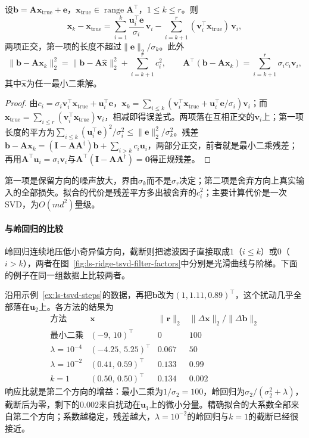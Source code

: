 \begin{theorem}[截断SVD的误差分解]
\label{thm:ls-tsvd-error-decomposition}
设$\bm b=\bm A\bm x_{\mathrm{true}}+\bm e$，$\bm x_{\mathrm{true}}\in\operatorname{range}\bm A^\top$，$1\leq k\leq r$。则
\[
 \bm x_k-\bm x_{\mathrm{true}}=\sum_{i=1}^k\frac{\bm u_i^\top\bm e}{\sigma_i}\,\bm v_i-\sum_{i=k+1}^r(\bm v_i^\top\bm x_{\mathrm{true}})\,\bm v_i ,
\]
两项正交，第一项的长度不超过$\lVert\bm e\rVert_2/\sigma_k$。此外
\[
 \lVert\bm b-\bm A\bm x_k\rVert_2^2=\lVert\bm b-\bm A\hat{\bm x}\rVert_2^2+\sum_{i=k+1}^rc_i^2,\qquad
 \bm A^\top(\bm b-\bm A\bm x_k)=\sum_{i=k+1}^r\sigma_ic_i\bm v_i ,
\]
其中$\hat{\bm x}$为任一最小二乘解。
\end{theorem}
\begin{proof}
由$c_i=\sigma_i\bm v_i^\top\bm x_{\mathrm{true}}+\bm u_i^\top\bm e$，$\bm x_k=\sum_{i\leq k}(\bm v_i^\top\bm x_{\mathrm{true}}+\bm u_i^\top\bm e/\sigma_i)\bm v_i$；而$\bm x_{\mathrm{true}}=\sum_{i\leq r}(\bm v_i^\top\bm x_{\mathrm{true}})\bm v_i$，相减即得误差式。两项落在互相正交的$\bm v_i$上；第一项长度的平方为$\sum_{i\leq k}(\bm u_i^\top\bm e)^2/\sigma_i^2\leq\lVert\bm e\rVert_2^2/\sigma_k^2$。残差$\bm b-\bm A\bm x_k=(\bm I-\bm A\bm A^\dagger)\bm b+\sum_{i>k}c_i\bm u_i$，两部分正交，前者就是最小二乘残差；再用$\bm A^\top\bm u_i=\sigma_i\bm v_i$与$\bm A^\top(\bm I-\bm A\bm A^\dagger)=\bm0$得正规残差。
\end{proof}

第一项是保留方向的噪声放大，界由$\sigma_k$而不是$\sigma_r$决定；第二项是舍弃方向上真实输入的全部损失。拟合的代价是残差平方多出被舍弃的$c_i^2$；主要计算代价是一次SVD，为$O(md^2)$量级。

\paragraph{与岭回归的比较}
岭回归连续地压低小奇异值方向，截断则把滤波因子直接取成$1$（$i\leq k$）或$0$（$i>k$），两者在图~\ref{fig:ls-ridge-tsvd-filter-factors}中分别是光滑曲线与阶梯。下面的例子在同一组数据上比较两者。

\begin{example}[岭回归与截断SVD的比较]
\label{ex:ls-regularization-response}
沿用示例~\ref{ex:ls-tsvd-steps}的数据，再把$\bm b$改为$(1,1.11,0.89)^\top$，这个扰动几乎全部落在$\bm u_2$上。各方法的结果为
\[
 \begin{array}{lccc}
  \text{方法} & \bm x & \lVert\bm r\rVert_2 & \lVert\Delta\bm x\rVert_2/\lVert\Delta\bm b\rVert_2\\[2pt]
  \text{最小二乘} & (-9,\,10)^\top & 0 & 100\\
  \lambda=10^{-4} & (-4.25,\,5.25)^\top & 0.067 & 50\\
  \lambda=10^{-2} & (0.41,\,0.59)^\top & 0.133 & 0.99\\
  k=1 & (0.50,\,0.50)^\top & 0.134 & 0.002
 \end{array}
\]
响应比就是第二个方向的增益：最小二乘为$1/\sigma_2=100$，岭回归为$\sigma_2/(\sigma_2^2+\lambda)$，截断后为零，剩下的$0.002$来自扰动在$\bm u_1$上的微小分量。精确拟合的大系数全部来自第二个方向；系数越稳定，残差越大，$\lambda=10^{-2}$的岭回归与$k=1$的截断已经很接近。
\end{example}

